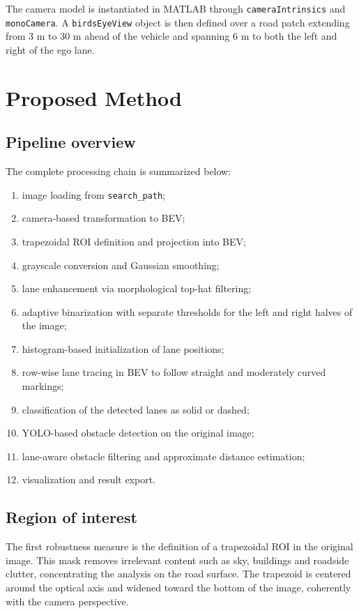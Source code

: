\documentclass[conference]{IEEEtran}
\begin{document}
The camera model is instantiated in MATLAB through \texttt{cameraIntrinsics} and \texttt{monoCamera}. A \texttt{birdsEyeView} object is then defined over a road patch extending from 3 m to 30 m ahead of the vehicle and spanning 6 m to both the left and right of the ego lane.

\section{Proposed Method}
\subsection{Pipeline overview}
The complete processing chain is summarized below:
\begin{enumerate}
    \item image loading from \texttt{search\_path};
    \item camera-based transformation to BEV;
    \item trapezoidal ROI definition and projection into BEV;
    \item grayscale conversion and Gaussian smoothing;
    \item lane enhancement via morphological top-hat filtering;
    \item adaptive binarization with separate thresholds for the left and right halves of the image;
    \item histogram-based initialization of lane positions;
    \item row-wise lane tracing in BEV to follow straight and moderately curved markings;
    \item classification of the detected lanes as solid or dashed;
    \item YOLO-based obstacle detection on the original image;
    \item lane-aware obstacle filtering and approximate distance estimation;
    \item visualization and result export.
\end{enumerate}

\subsection{Region of interest}
The first robustness measure is the definition of a trapezoidal ROI in the original image. This mask removes irrelevant content such as sky, buildings and roadside clutter, concentrating the analysis on the road surface. The trapezoid is centered around the optical axis and widened toward the bottom of the image, coherently with the camera perspective.
\end{document}
